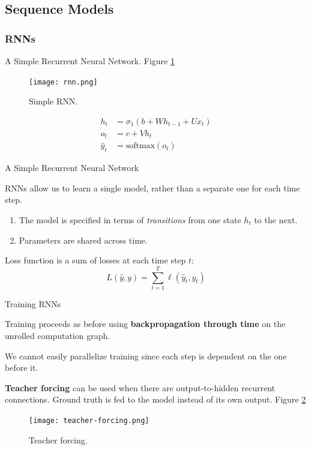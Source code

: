 \documentclass[english]{article}
\begin{document}
\subsection{Sequence Models}
\subsubsection{RNNs} %
\benum
\item 
 {A Simple Recurrent Neural Network}.  Figure \ref{Simple RNN}

\begin{figure}
  \centering
\texttt{[image: rnn.png]}
    \caption{Simple RNN.}
    \label{Simple RNN}
\end{figure}

\begin{align*}
h_t &= \sigma_1(b+Wh_{t-1}+Ux_t)\\
o_t &= c+Vh_t\\
\hat{y}_t &= \text{softmax}(o_t)
\end{align*}
 

\item 
 {A Simple Recurrent Neural Network}

RNNs allow us to learn a single model, rather than a separate one for each time step.
\begin{enumerate}
\item The model is specified in terms of \textit{transitions} from one state $h_t$ to the next.
\item Parameters are shared across time.
 
\end{enumerate}
Loss function is a sum of losses at each time step $t$:
$$L(\hat{y},y)=\sum_{t=1}^T \ell(\hat{y}_t, y_t)$$
 

\item 
 {Training RNNs}

Training proceeds as before using \textbf{backpropagation through time} on the unrolled computation graph.
 
We cannot easily parallelize training since each step is dependent on the one before it.
 
\textbf{Teacher forcing} can be used when there are output-to-hidden recurrent connections. Ground truth is fed to the model instead of its own output.  Figure \ref{Teacher forcing}
\begin{figure}
\centering
\texttt{[image: teacher-forcing.png]}
    \caption{Teacher forcing.}
    \label{Teacher forcing}
\end{figure}
 
\end{document}
